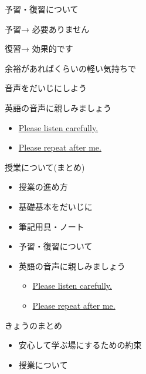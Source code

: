 \documentclass[
  ignorenonframetext,
  aspectratio=169,
  xcolor=dvipsnames]{beamer}
\providecommand{\tightlist}{%
  \setlength{\itemsep}{0pt}\setlength{\parskip}{0pt}}
\begin{document}
\begin{frame}{予習・復習について}
\label{ux4e88ux7fd2ux5fa9ux7fd2ux306bux3064ux3044ux3066}
\LARGE

予習\pause → 必要ありません

\pause

\bigskip

復習\pause → 効果的です

\phantom{　　　　}余裕があればくらいの軽い気持ちで
\end{frame}

\begin{frame}{音声をだいじにしよう}
\label{ux97f3ux58f0ux3092ux3060ux3044ux3058ux306bux3057ux3088ux3046}
\LARGE

英語の音声に親しみましょう

\begin{itemize}[<+->]
\tightlist
\item
  \href{./audio/listen.mp3}{Please listen carefully.}
\item
  \href{./audio/repeat.mp3}{Please repeat after me.}
\end{itemize}
\end{frame}

\begin{frame}{授業について(まとめ)}
\label{ux6388ux696dux306bux3064ux3044ux3066ux307eux3068ux3081}
\Large

\begin{itemize}
\item 授業の進め方
\item 基礎基本をだいじに
\item 筆記用具・ノート
\item 予習・復習について
\item 英語の音声に親しみましょう
      \begin{itemize}
         \item  \href{./audio/listen.mp3}{Please listen carefully.}
         \item  \href{./audio/repeat.mp3}{Please repeat after me.}
      \end{itemize}
\end{itemize}
\end{frame}

\begin{frame}{きょうのまとめ}
\label{ux304dux3087ux3046ux306eux307eux3068ux3081}
\LARGE

\begin{itemize}
\item  安心して学ぶ場にするための約束
\item  授業について
\end{itemize}
\end{frame}
\end{document}
